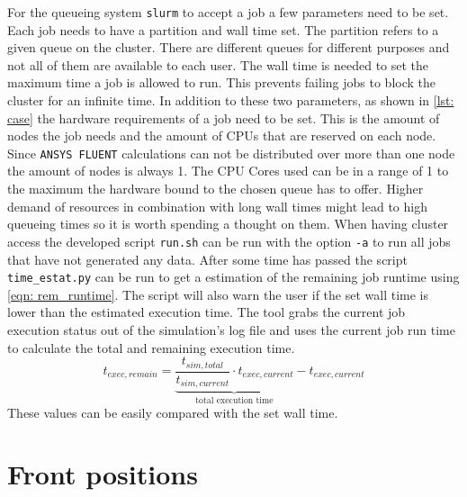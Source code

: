 \documentclass[../thesis.tex]{subfiles}
\begin{document}
For the queueing system \texttt{slurm} to accept a job a few parameters need to be set. Each job needs to have a partition and wall time set. The partition refers to a given queue on the cluster. There are different queues for different purposes and not all of them are available to each user.
The wall time is needed to set the maximum time a job is allowed to run. This prevents failing jobs to block the cluster for an infinite time. In addition to these two parameters, as shown in \autoref{lst: case} the hardware requirements of a job need to be set. This is the amount of nodes the job needs and the amount of CPUs that are reserved on each node. Since \texttt{ANSYS FLUENT} calculations can not be distributed over more than one node the amount of nodes is always 1. The CPU Cores used can be in a range of 1 to the maximum the hardware bound to the chosen queue has to offer. Higher demand of resources in combination with long wall times might lead to high queueing times so it is worth spending a thought on them. When having cluster access the developed script \texttt{run.sh} can be run with the option \texttt{-a} to run all jobs that have not generated any data. After some time has passed the script \texttt{time\_estat.py} can be run to get a estimation of the remaining job runtime using \autoref{eqn: rem_runtime}. The script will also warn the user if the set wall time is lower than the estimated execution time. The tool grabs the current job execution status out of the simulation's log file and uses the current job run time to calculate the total and remaining execution time. 
\begin{equation}
\label{eqn: rem_runtime}
t_{exec,remain} = \underbrace{\dfrac{t_{sim,total}}{t_{sim,current}} \cdot t_{exec,current}}_{\text{total execution time}}  - t_{exec,current} 
\end{equation}
These values can be easily compared with the set wall time.

\section{Front positions}
\end{document}
